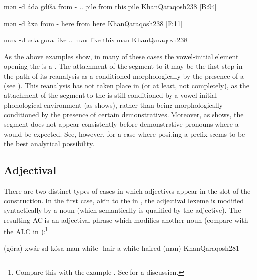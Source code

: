 {mən -d\cb{} áḏa gdíša}
{from -\cst\cb{} \dem.\near.\masc{} pile}
{from this pile}
{KhanQaraqosh}{238 {[B:94]}}

{mən -d\cb{} àxa}
{from -\cst\cb{} here}
{from here}
{KhanQaraqosh}{238 {[F:11]}}


{max -d\cb{} aḏa gora}
{like \cst\cb{} \dem.\near.\masc{} man}
{like this man}
{KhanQaraqosh}{238}


As the above examples show, in many of these cases the vowel-initial element opening the \secn is a . The attachment of the  segment to it may be the first step in the path of its reanalysis as a \gen* {} conditioned morphologically by the presence of a \dem* (see ). This reanalysis has not taken place in \Qar (or at least, not completely), as the attachment of the   segment to the \secn is still conditioned by a vowel-initial phonological environment (as  shows), rather than being morphologically conditioned by the presence of certain demonstratives.  Moreover, as  shows, the  segment does not appear consistently before demonstrative pronouns where a  would be expected. See, however,  for a case where positing a \gen* prefix seems to be the best analytical possibility.


 
\subsection{Adjectival \prims}

There are two distinct types of cases in which adjectives appear in the \prim slot of the \cst* construction. In the first case, akin to the  in , the adjectival lexeme is modified syntactically by a \secn noun (which semantically is qualified by the adjective). The resulting AC is an adjectival phrase which modifies another noun (compare with the ALC in ):\footnote{Compare this with the \CArab example  \citep[277]{GoldenbergSemitic}. See  \textcites[204ff.]{GoldenbergAdjectivization} for a discussion.}

{(góra) xwár-əd kósa}
{man white-\cst{} hair}
{a white-haired (man)}
{KhanQaraqosh}{281}

